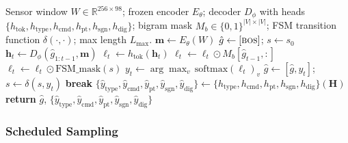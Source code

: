 \documentclass[sensors,article,submit,moreauthors,pdftex]{Definitions/mdpi}
\newcommand{\modelname}{G-Code Decoder}
\begin{document}
\begin{algorithm}[ht]
\renewcommand{\baselinestretch}{1.35}\selectfont
\caption{Grammar-masked autoregressive forward pass for \modelname{}.}
\label{alg:forward}
\begin{algorithmic}[1]
\setlength{\itemsep}{2pt}
\Require Sensor window $W \in \mathbb{R}^{256 \times 98}$; frozen encoder $E_\theta$; decoder $D_\phi$ with heads $\{h_{\text{tok}}, h_{\text{type}}, h_{\text{cmd}}, h_{\text{pt}}, h_{\text{sgn}}, h_{\text{dig}}\}$; bigram mask $M_b \in \{0,1\}^{|V|\times|V|}$; FSM transition function $\delta(\cdot,\cdot)$; max length $L_{\max}$.
\Statex
\State $\mathbf{m} \gets E_\theta(W)$ 
\State $\hat{g} \gets [\textsc{bos}]$; $s \gets s_0$ 
  \State $\mathbf{h}_t \gets D_\phi(\hat{g}_{1:t-1}, \mathbf{m})$ 
  \State $\boldsymbol{\ell}_t \gets h_{\text{tok}}(\mathbf{h}_t)$ 
  \State $\boldsymbol{\ell}_t \gets \boldsymbol{\ell}_t \odot M_b[\hat{g}_{t-1}, :]$ 
  \State $\boldsymbol{\ell}_t \gets \boldsymbol{\ell}_t \odot \mathrm{FSM\_mask}(s)$ 
  \State $y_t \gets \arg\max_v \, \mathrm{softmax}(\boldsymbol{\ell}_t)_v$
  \State $\hat{g} \gets [\hat{g}, y_t]$; $s \gets \delta(s, y_t)$
   \textbf{break} \EndIf
\EndFor
\State $\{\hat{y}_{\text{type}}, \hat{y}_{\text{cmd}}, \hat{y}_{\text{pt}}, \hat{y}_{\text{sgn}}, \hat{y}_{\text{dig}}\} \gets \{h_{\text{type}}, h_{\text{cmd}}, h_{\text{pt}}, h_{\text{sgn}}, h_{\text{dig}}\}(\mathbf{H})$ 
\State \textbf{return} $\hat{g}$, $\{\hat{y}_{\text{type}}, \hat{y}_{\text{cmd}}, \hat{y}_{\text{pt}}, \hat{y}_{\text{sgn}}, \hat{y}_{\text{dig}}\}$
\end{algorithmic}
\end{algorithm}

\subsubsection{Scheduled Sampling}
\label{sec:scheduled-sampling}
\end{document}
